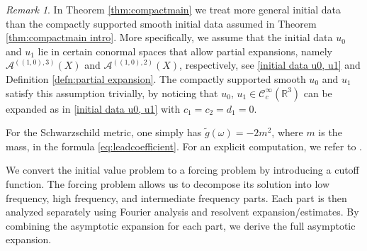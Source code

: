 \documentclass[10pt,a4paper,reqno]{amsart}
\newcommand{\CcI}{\mathcal{C}_c^\infty}
\newcommand{\RR}{\mathbb{R}}
\newcommand{\A}{\mathcal{A}}
\theoremstyle{definition}
\theoremstyle{remark}
\newtheorem{remark}[theorem]{Remark}
\numberwithin{equation}{section}
\begin{document}
\begin{remark}
\label{rmk:general intial data p=3}
In Theorem \ref{thm:compactmain} we treat more general initial data than the compactly supported smooth initial data assumed in Theorem \ref{thm:compactmain intro}. More specifically, we assume that the initial data $u_0$ and $u_1$ lie in certain conormal spaces that allow partial expansions, namely $\A^{((1,0),3)}(X)$ and $\A^{((1,0),2)}(X)$, respectively, see \eqref{initial data u0, u1} and Definition \ref{defn:partial expansion}. The compactly supported smooth $u_0$ and $u_1$ satisfy this assumption trivially, by noticing that $u_0,\,u_1\in\CcI(\RR^3)$ can be expanded as in \eqref{initial data u0, u1} with $c_1=c_2=d_1=0$.

For the Schwarzschild metric, one simply has $\tilde{g}(\omega)=-2m^2$, where $m$ is the mass, in the formula \eqref{eq:leadcoefficient}. For an explicit computation, we refer to \cite[Section 4.1]{Hin22}.
\end{remark}

We convert the initial value problem to a forcing problem by introducing a cutoff function. The forcing problem allows us to decompose its solution into low frequency, high frequency, and intermediate frequency parts. Each part is then analyzed separately using Fourier analysis and resolvent expansion/estimates. By combining the asymptotic expansion for each part, we derive the full asymptotic expansion. 
\end{document}
